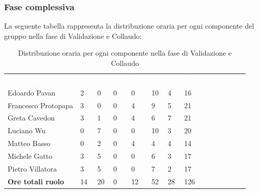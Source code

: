 \subsubsection{Fase complessiva}
La seguente tabella rappresenta la distribuzione oraria per ogni componente del gruppo nella fase di Validazione e Collaudo:
\begin{table}[H]
\begin{center}
\renewcommand{\arraystretch}{1.25}
\begin{tabular}{ m{}<{\centering}  m{}<{\centering} m{}<{\centering} m{}<{\centering}  m{}<{\centering}  m{}<{\centering}  m{}<{\centering}  m{}<{\centering}   }
	\rowcolor{darkblue}
	\textcolor{white}{\textbf{Componente}} &\textcolor{white}{\textbf{Re}}&\textcolor{white}{\textbf{Pt}}&\textcolor{white}{\textbf{An}}&\textcolor{white}{\textbf{Am}}&\textcolor{white}{\textbf{Pr}}&\textcolor{white}{\textbf{Ve}}&\textcolor{white}{\textbf{Ore complessive}}\\ 
	Edoardo Pavan & 2 & 0 & 0 & 0 & 10 & 4 & 16 \\	
	
	Francesco Protopapa & 3 & 0 & 0 & 4 & 9 & 5 & 21 \\

	Greta Cavedon & 3 & 1 & 0 & 4 & 6 & 7 & 21 \\
	
	Luciano Wu & 0 & 7 & 0 & 0 & 10 & 3 & 20 \\
	
	Matteo Basso & 0 & 2 & 0 & 4 & 4 & 4 & 14 \\
	
	Michele Gatto & 3 & 5 & 0 & 0 & 6 & 3 & 17 \\
	
	Pietro Villatora & 3 & 5 & 0 & 0 & 7 & 2 & 17 \\
	
	\textbf{Ore totali ruolo} & 14 & 20 & 0 & 12 & 52 & 28 & 126\\

\end{tabular}
\caption{Distribuzione oraria per ogni componente nella fase di Validazione e Collaudo}
\end{center}
\end{table}

